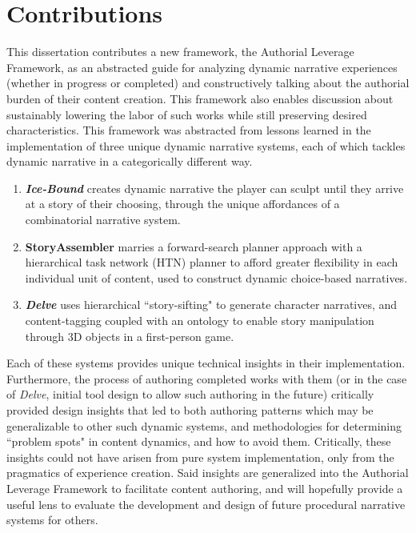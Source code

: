 \section{Contributions}

This dissertation contributes a new framework, the Authorial Leverage Framework, as an abstracted guide for analyzing dynamic narrative experiences (whether in progress or completed) and constructively talking about the authorial burden of their content creation. This framework also enables discussion about sustainably lowering the labor of such works while still preserving desired characteristics. This framework was abstracted from lessons learned in the implementation of three unique dynamic narrative systems, each of which tackles dynamic narrative in a categorically different way.

\begin{enumerate}
    \item \textbf{\textit{Ice-Bound}} creates dynamic narrative the player can sculpt until they arrive at a story of their choosing, through the unique affordances of a combinatorial narrative system.
    \item \textbf{StoryAssembler} marries a forward-search planner approach with a hierarchical task network (HTN) planner to afford greater flexibility in each individual unit of content, used to construct dynamic choice-based narratives.
    \item \textbf{\textit{Delve}} uses hierarchical ``story-sifting" to generate character narratives, and content-tagging coupled with an ontology to enable story manipulation through 3D objects in a first-person game.
\end{enumerate}

Each of these systems provides unique technical insights in their implementation. Furthermore, the process of authoring completed works with them (or in the case of \textit{Delve}, initial tool design to allow such authoring in the future) critically provided design insights that led to both authoring patterns which may be generalizable to other such dynamic systems, and methodologies for determining ``problem spots" in content dynamics, and how to avoid them. Critically, these insights could not have arisen from pure system implementation, only from the pragmatics of experience creation. Said insights are generalized into the Authorial Leverage Framework to facilitate content authoring, and will hopefully provide a useful lens to evaluate the development and design of future procedural narrative systems for others.

